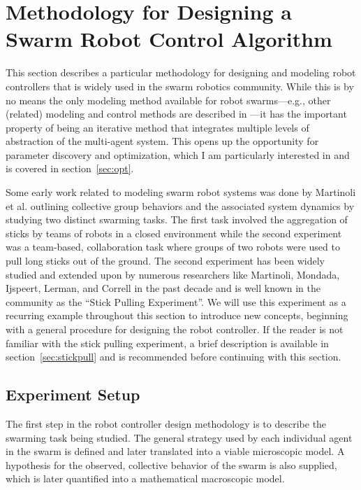 \documentclass[Main.tex]{subfiles}
\begin{document}
\section{Methodology for Designing a Swarm Robot Control Algorithm}

This section describes a particular methodology for designing and modeling robot controllers that is widely used in the swarm robotics community. While this is by no means the only modeling method available for robot swarms---e.g., other (related) modeling and control methods are described in \cite{Bayazit2005, Berman2007, Billard1999, Sugawara2013}---it has the important property of being an iterative method that integrates multiple levels of abstraction of the multi-agent system. This opens up the opportunity for parameter discovery  and optimization, which I am particularly interested in and is covered in section~\ref{sec:opt}.

Some early work related to modeling swarm robot systems was done by Martinoli et al.\cite{Martinoli1995, Martinoli2004} outlining collective group behaviors and the associated system dynamics by studying two distinct swarming tasks. The first task involved the aggregation of sticks by teams of robots in a closed environment while the second experiment was a team-based, collaboration task where groups of two robots were used to pull long sticks out of the ground. The second experiment has been widely studied and extended upon by numerous researchers like Martinoli, Mondada, Ijspeert, Lerman, and Correll in the past decade and is well known in the community as the ``Stick Pulling Experiment''. We will use this experiment as a recurring example throughout this section to introduce new concepts, beginning with a general procedure for designing the robot controller. If the reader is not familiar with the stick pulling experiment, a brief description is available in section~\ref{sec:stickpull} and is recommended before continuing with this section.

\subsection{Experiment Setup}
The first step in the robot controller design methodology is to describe the swarming task being studied. The general strategy used by each individual agent in the swarm is defined and later translated into a viable microscopic model. A hypothesis for the observed, collective behavior of the swarm is also supplied, which is later quantified into a mathematical macroscopic model.
\end{document}
